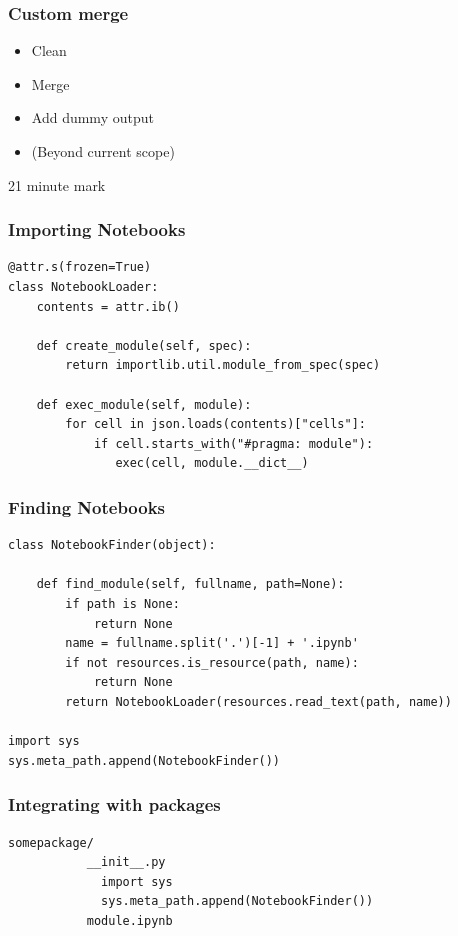 \begin{frame}
\frametitle{Custom merge}

\begin{itemize}
\item Clean
\item Merge
\item Add dummy output
\item (Beyond current scope)
\end{itemize}

\end{frame}


21 minute mark

\begin{frame}[fragile]
\frametitle{Importing Notebooks}

\begin{lstlisting}
@attr.s(frozen=True)
class NotebookLoader:
    contents = attr.ib()

    def create_module(self, spec):
        return importlib.util.module_from_spec(spec)

    def exec_module(self, module):
        for cell in json.loads(contents)["cells"]:
            if cell.starts_with("#pragma: module"):
               exec(cell, module.__dict__)
\end{lstlisting}

\end{frame}

\begin{frame}[fragile]
\frametitle{Finding Notebooks}

\begin{lstlisting}
class NotebookFinder(object):
 
    def find_module(self, fullname, path=None):
        if path is None:
            return None
        name = fullname.split('.')[-1] + '.ipynb'
        if not resources.is_resource(path, name):
            return None
        return NotebookLoader(resources.read_text(path, name))

import sys
sys.meta_path.append(NotebookFinder())
\end{lstlisting}

\end{frame}

\begin{frame}[fragile]
\frametitle{Integrating with packages}

\begin{lstlisting}
somepackage/
           __init__.py
             import sys
             sys.meta_path.append(NotebookFinder())
           module.ipynb
\end{lstlisting}

\end{frame}


